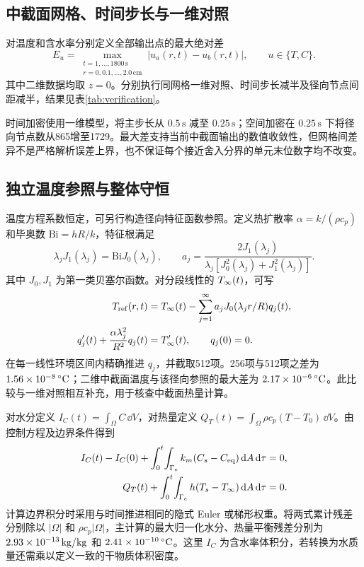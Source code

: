 \subsection{中截面网格、时间步长与一维对照}
对温度和含水率分别定义全部输出点的最大绝对差
\begin{equation}
 E_u=\max_{\substack{t=1,\ldots,1800\,\mathrm{s}\\r=0,0.1,\ldots,2.0\,\mathrm{cm}}}
 \left|u_a(r,t)-u_b(r,t)\right|,\qquad u\in\{T,C\}.
 \label{eq:error}
\end{equation}
其中二维数据均取 $z=0$。分别执行同网格一维对照、时间步长减半及径向节点间距减半，结果见表\ref{tab:verification}。

时间加密使用一维模型，将主步长从 $0.5\,\mathrm{s}$ 减至 $0.25\,\mathrm{s}$；空间加密在 $0.25\,\mathrm{s}$ 下将径向节点数从865增至1729。最大差支持当前中截面输出的数值收敛性，但网格间差异不是严格解析误差上界，也不保证每个接近舍入分界的单元末位数字均不改变。

\subsection{独立温度参照与整体守恒}
温度方程系数恒定，可另行构造径向特征函数参照。定义热扩散率 $\alpha=k/(\rho c_p)$ 和毕奥数 $\mathrm{Bi}=hR/k$，特征根满足
\begin{equation}
 \lambda_jJ_1(\lambda_j)=\mathrm{Bi}J_0(\lambda_j),\qquad
 a_j=\frac{2J_1(\lambda_j)}{\lambda_j[J_0^2(\lambda_j)+J_1^2(\lambda_j)]}.
 \label{eq:bessel}
\end{equation}
其中 $J_0,J_1$ 为第一类贝塞尔函数。对分段线性的 $T_{\infty}(t)$，可写
\begin{equation}
 \begin{aligned}
 T_{\mathrm{ref}}(r,t)&=T_{\infty}(t)-\sum_{j=1}^{\infty}a_jJ_0(\lambda_jr/R)q_j(t),\\
 q'_j(t)+\frac{\alpha\lambda_j^2}{R^2}q_j(t)&=T_{\infty}'(t),\qquad q_j(0)=0.
 \end{aligned}
 \label{eq:reference}
\end{equation}
在每一线性环境区间内精确推进 $q_j$，并截取512项。256项与512项之差为 $1.56\times10^{-8}\,{}^{\circ}\mathrm{C}$；二维中截面温度与该径向参照的最大差为 $2.17\times10^{-6}\,{}^{\circ}\mathrm{C}$。此比较与一维对照相互补充，用于核查中截面热量计算。

对水分定义 $I_C(t)=\int_\Omega C\,\dd V$，对热量定义 $Q_T(t)=\int_\Omega\rho c_p(T-T_0)\,\dd V$。由控制方程及边界条件得到
\begin{align}
 I_C(t)-I_C(0)+\int_0^t\!\int_{\Gamma_e}k_m(C_s-C_{\mathrm{eq}})\,\mathrm{d} A\,\mathrm{d}\tau&=0,\label{eq:masscheck}\\
 Q_T(t)+\int_0^t\!\int_{\Gamma_e}h(T_s-T_{\infty})\,\mathrm{d} A\,\mathrm{d}\tau&=0.\label{eq:heatcheck}
\end{align}
计算边界积分时采用与时间推进相同的隐式 Euler 或梯形权重。将两式累计残差分别除以 $|\Omega|$ 和 $\rho c_p|\Omega|$，主计算的最大归一化水分、热量平衡残差分别为 $2.93\times10^{-13}\,\mathrm{kg/kg}$ 和 $2.41\times10^{-10}\,{}^{\circ}\mathrm{C}$。这里 $I_C$ 为含水率体积分，若转换为水质量还需乘以定义一致的干物质体积密度。

